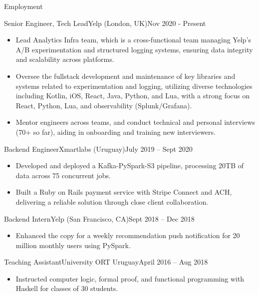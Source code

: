 \documentclass[]{mcdowellcv}
\begin{document}
	\makeheader
	
	\begin{cvsection}{Employment}
		\begin{cvsubsection}{Senior Engineer, Tech Lead}{Yelp (London, UK)}{Nov 2020 - Present}	
			\begin{itemize}
				\item Lead Analytics Infra team, which is a cross-functional team managing Yelp's A/B experimentation and structured logging systems, ensuring data integrity and scalability across platforms.
				\item Oversee the fullstack development and maintenance of key libraries and systems related to experimentation and logging, utilizing diverse technologies including Kotlin, iOS, React, Java, Python, and Lua, with a strong focus on React, Python, Lua, and observability (Splunk/Grafana).
				\item Mentor engineers across teams, and conduct technical and personal interviews (70+ so far), aiding in onboarding and training new interviewers.
			\end{itemize}
		\end{cvsubsection}
		
		
		\begin{cvsubsection}{Backend Engineer}{Xmartlabs (Uruguay)}{July 2019 -- Sept 2020}	
			\begin{itemize}
				\item Developed and deployed a Kafka-PySpark-S3 pipeline, processing 20TB of data across 75 concurrent jobs.
				\item Built a Ruby on Rails payment service with Stripe Connect and ACH, delivering a reliable solution through close client collaboration.
			\end{itemize}
		\end{cvsubsection}
		
		\begin{cvsubsection}{Backend Intern}{Yelp (San Francisco, CA)}{Sept 2018 -- Dec 2018}		
			\begin{itemize}
				\item Enhanced the copy for a weekly recommendation push notification for 20 million monthly users using PySpark.
			\end{itemize}
		\end{cvsubsection}

		\begin{cvsubsection}{Teaching Assistant}{University ORT Uruguay}{April 2016 -- Aug 2018}		
			\begin{itemize}
				\item Instructed computer logic, formal proof, and functional programming with Haskell for classes of 30 students.
			\end{itemize}
		\end{cvsubsection}
	\end{cvsection}
	
\end{document}
